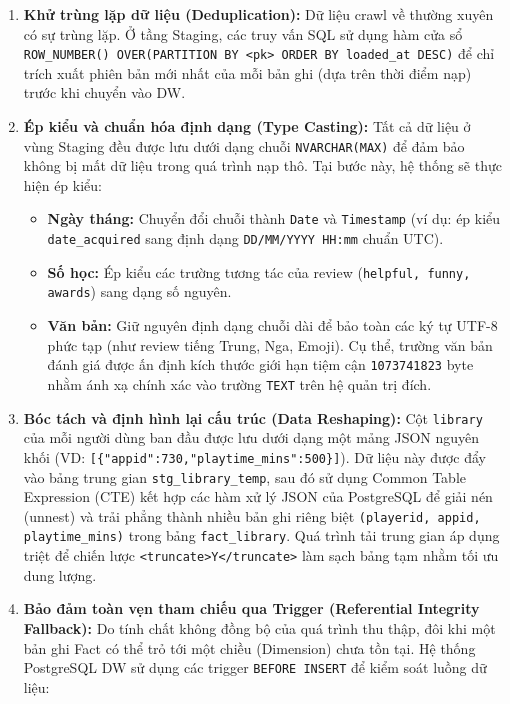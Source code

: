\begin{enumerate}
    \item \textbf{Khử trùng lặp dữ liệu (Deduplication):} Dữ liệu crawl về thường xuyên có sự trùng lặp. Ở tầng Staging, các truy vấn SQL sử dụng hàm cửa sổ \texttt{ROW\_NUMBER() OVER(PARTITION BY <pk> ORDER BY loaded\_at DESC)} để chỉ trích xuất phiên bản mới nhất của mỗi bản ghi (dựa trên thời điểm nạp) trước khi chuyển vào DW. 
    \item \textbf{Ép kiểu và chuẩn hóa định dạng (Type Casting):} Tất cả dữ liệu ở vùng Staging đều được lưu dưới dạng chuỗi \texttt{NVARCHAR(MAX)} để đảm bảo không bị mất dữ liệu trong quá trình nạp thô. Tại bước này, hệ thống sẽ thực hiện ép kiểu:
    \begin{itemize}
        \item \textbf{Ngày tháng:} Chuyển đổi chuỗi thành \texttt{Date} và \texttt{Timestamp} (ví dụ: ép kiểu \texttt{date\_acquired} sang định dạng \texttt{DD/MM/YYYY HH:mm} chuẩn UTC).
        \item \textbf{Số học:} Ép kiểu các trường tương tác của review (\texttt{helpful, funny, awards}) sang dạng số nguyên.
        \item \textbf{Văn bản:} Giữ nguyên định dạng chuỗi dài để bảo toàn các ký tự UTF-8 phức tạp (như review tiếng Trung, Nga, Emoji). Cụ thể, trường văn bản đánh giá được ấn định kích thước giới hạn tiệm cận \texttt{1073741823} byte nhằm ánh xạ chính xác vào trường \texttt{TEXT} trên hệ quản trị đích.
    \end{itemize}
    \item \textbf{Bóc tách và định hình lại cấu trúc (Data Reshaping):} Cột \texttt{library} của mỗi người dùng ban đầu được lưu dưới dạng một mảng JSON nguyên khối (VD: \texttt{[\{"appid":730,"playtime\_mins":500\}]}). Dữ liệu này được đẩy vào bảng trung gian \texttt{stg\_library\_temp}, sau đó sử dụng Common Table Expression (CTE) kết hợp các hàm xử lý JSON của PostgreSQL để giải nén (unnest) và trải phẳng thành nhiều bản ghi riêng biệt \texttt{(playerid, appid, playtime\_mins)} trong bảng \texttt{fact\_library}. Quá trình tải trung gian áp dụng triệt để chiến lược \texttt{<truncate>Y</truncate>} làm sạch bảng tạm nhằm tối ưu dung lượng.
    \item \textbf{Bảo đảm toàn vẹn tham chiếu qua Trigger (Referential Integrity Fallback):} Do tính chất không đồng bộ của quá trình thu thập, đôi khi một bản ghi Fact có thể trỏ tới một chiều (Dimension) chưa tồn tại. Hệ thống PostgreSQL DW sử dụng các trigger \texttt{BEFORE INSERT} để kiểm soát luồng dữ liệu:

\end{enumerate}
